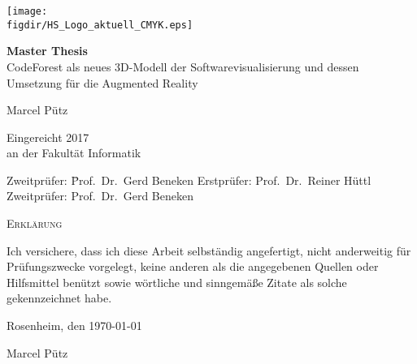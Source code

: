 \begin{titlepage}

\raggedleft

\texttt{[image: \\figdir/HS\_Logo\_aktuell\_CMYK.eps]}

\vfill

\centering
\LARGE
\textbf{Master Thesis}
\vspace{1cm}\\

\LARGE
CodeForest als neues 3D-Modell der Softwarevisualisierung und dessen Umsetzung für die Augmented Reality
\vspace{1cm}

\Large
Marcel Pütz
\vspace{1cm}

\flushleft
\Large
\vspace*{\fill}

Eingereicht 2017 \\
an der Fakultät Informatik
\begin{tabbing}
Zweitprüfer: \= Prof.\ Dr.\ Gerd Beneken\kill
Erstprüfer: \> Prof.\ Dr.\ Reiner Hüttl\\
Zweitprüfer: \> Prof.\ Dr.\ Gerd Beneken
\end{tabbing}

\end{titlepage}

\cleardoubleemptypage

{
\large
\thispagestyle{empty}
\vspace*{\fill}

\noindent
\textsc{Erklärung}

\medskip

\noindent
Ich versichere, dass ich diese Arbeit selbständig
angefertigt, nicht anderweitig für Prüfungszwecke
vorgelegt, keine anderen als die angegebenen Quellen
oder Hilfsmittel benützt sowie wörtliche und
sinngemäße Zitate als solche gekennzeichnet habe.

\bigskip

\noindent
Rosenheim, den \today

\vspace*{2cm}

\noindent
Marcel Pütz
}

